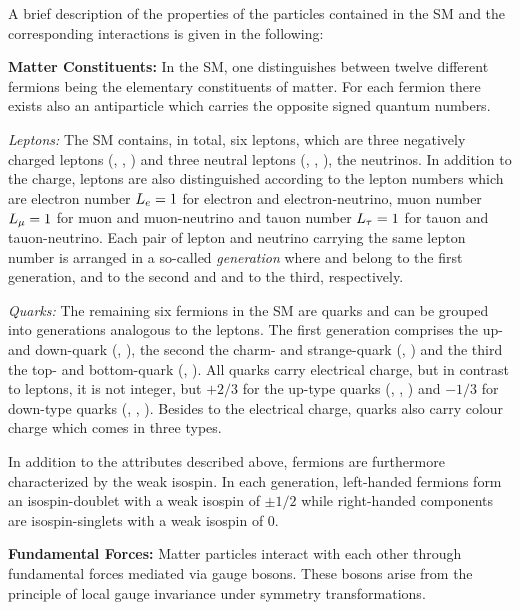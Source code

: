 A brief description of the properties of the particles contained in the SM and the corresponding interactions is given in the following:
\begin{description}

\item \textbf{Matter Constituents:}
In the SM, one distinguishes between twelve different fermions being the elementary constituents of matter. For each fermion there exists also an antiparticle which carries the opposite signed quantum numbers.
 \begin{description}
  \item \textit{Leptons:} The SM contains, in total, six leptons, which are three negatively charged leptons (\lel, \lmu, \ltau) and three neutral leptons (\nue, \numu, \nutau), the neutrinos. In addition to the charge, leptons are also distinguished according to the lepton numbers which are electron number $L_{e} = 1$ for electron and electron-neutrino, muon number $L_{\mu} = 1$ for muon and muon-neutrino and tauon number $L_{\tau} = 1$ for tauon and tauon-neutrino. Each pair of lepton and neutrino carrying the same lepton number is arranged in a so-called \textit{generation} where \lel and \nue belong to the first generation, \lmu and \numu to the second and \ltau and \nutau to the third, respectively.
  \item \textit{Quarks:} The remaining six fermions in the SM are quarks and can be grouped into generations analogous to the leptons. The first generation comprises the up- and down-quark (\qu, \qd), the second the charm- and strange-quark (\qc, \qs) and the third the top- and bottom-quark (\qt, \qb). All quarks carry electrical charge, but in contrast to leptons, it is not integer, but $+2/3$ for the up-type quarks (\qu, \qc, \qt) and $-1/3$ for down-type quarks (\qd, \qs, \qb). Besides to the electrical charge, quarks also carry colour charge which comes in three types.
 \end{description}
In addition to the attributes described above, fermions are furthermore characterized by the weak isospin. In each generation, left-handed fermions form an isospin-doublet with a weak isospin of $\pm 1/2$ while right-handed components are isospin-singlets with a weak isospin of 0. 
\item \textbf{Fundamental Forces:}
Matter particles interact with each other through fundamental forces mediated via gauge bosons. These bosons arise from the principle of local gauge invariance under symmetry transformations. 
 \begin{description}

\end{description}
\end{description}
